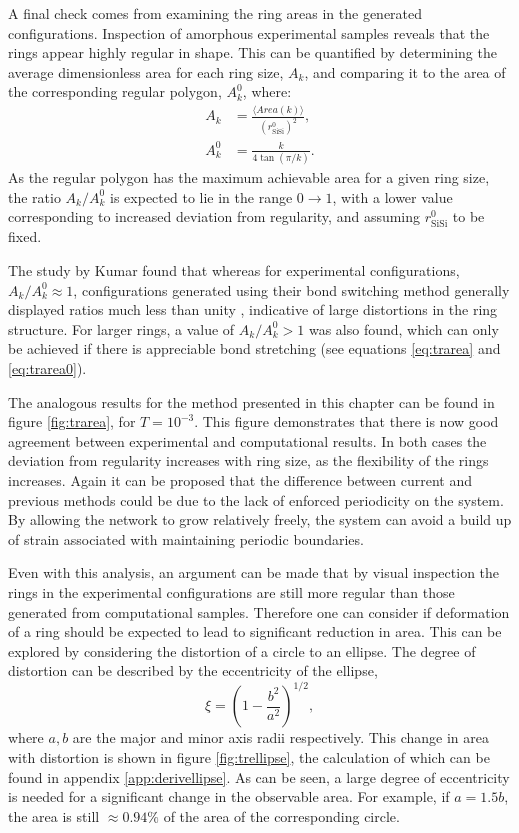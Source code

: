 A final check comes from examining the ring areas in the generated configurations.
Inspection of amorphous experimental samples reveals that the rings appear highly regular in shape. 
This can be quantified by determining the average dimensionless area for each ring size, $A_k$, and comparing it to the area of the corresponding regular polygon, $A_k^0$, where:
\begin{align}
	A_k &= \frac{\langle Area\left(k\right) \rangle}{\left(r_{\text{SiSi}}^{0}\right)^2}, \label{eq:trarea} \\[0.5em]
	A_k^0 &= \frac{k}{4\tan\left(\pi / k \right)} \label{eq:trarea0}.
\end{align}
As the regular polygon has the maximum achievable area for a given ring size, the ratio $A_k / A_k^0$ is expected to lie in the range $0\rightarrow 1$, with a lower value corresponding to increased deviation from regularity, and assuming $r_{\text{SiSi}}^{0}$ to be fixed.

The study by Kumar \etal{} found that whereas for experimental configurations, $A_k / A_k^0 \approx 1$, configurations generated using their bond switching method generally displayed ratios much less than unity \cite{Kumar2012}, indicative of large distortions in the ring structure. 
For larger rings, a value of $A_k / A_k^0 > 1$ was also found, which can only be achieved if there is appreciable bond stretching (see equations \eqref{eq:trarea} and \eqref{eq:trarea0}). 

The analogous results for the method presented in this chapter can be found in figure \ref{fig:trarea}, for $T=10^{-3}$. 
This figure demonstrates that there is now good agreement between experimental and computational results. 
In both cases the deviation from regularity increases with ring size, as the flexibility of the rings increases. 
Again it can be proposed that the difference between current and previous methods could be due to the lack of enforced periodicity on the system. 
By allowing the network to grow relatively freely, the system can avoid a build up of strain associated with maintaining periodic boundaries.

Even with this analysis, an argument can be made that by visual inspection the rings in the experimental configurations are still more regular than those generated from computational samples. 
Therefore one can consider if deformation of a ring should be expected to lead to significant reduction in area. 
This can be explored by considering the distortion of a circle to an ellipse. 
The degree of distortion can be described by the eccentricity of the ellipse,
\begin{equation}
	\xi = \left(1-\frac{b^2}{a^2}\right)^{1/2},
\end{equation}
where $a,b$ are the major and minor axis radii respectively. 
This change in area with distortion is shown in figure \ref{fig:trellipse}, the calculation of which can be found in appendix \ref{app:derivellipse}. 
As can be seen, a large degree of eccentricity is needed for a significant change in the observable area. 
For example, if $a=1.5 b$, the area is still $\approx0.94\%$ of the area of the corresponding circle. 


